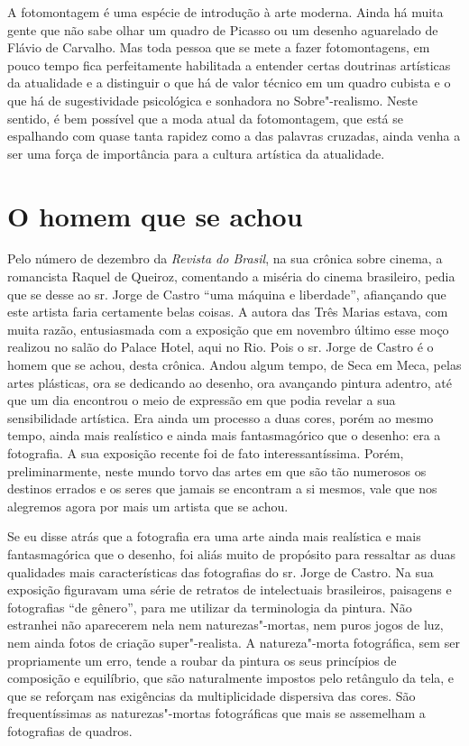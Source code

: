 A fotomontagem é uma espécie de introdução à arte moderna. Ainda há
muita gente que não sabe olhar um quadro de Picasso ou um desenho
aguarelado de Flávio de Carvalho. Mas toda pessoa que se mete a fazer
fotomontagens, em pouco tempo fica perfeitamente habilitada a entender
certas doutrinas artísticas da atualidade e a distinguir o que há de
valor técnico em um quadro cubista e o que há de sugestividade
psicológica e sonhadora no Sobre"-realismo. Neste sentido, é bem possível
que a moda atual da fotomontagem, que está se espalhando com quase tanta
rapidez como a das palavras cruzadas, ainda venha a ser uma força de
importância para a cultura artística da atualidade.

\chapter{O homem que se achou}

Pelo número de dezembro da \emph{Revista do Brasil}, na sua crônica
sobre cinema, a romancista Raquel de Queiroz, comentando a miséria do
cinema brasileiro, pedia que se desse ao sr. Jorge de Castro ``uma
máquina e liberdade'', afiançando que este artista faria certamente
belas coisas. A autora das Três Marias estava, com muita razão,
entusiasmada com a exposição que em novembro último esse moço realizou
no salão do Palace Hotel, aqui no Rio. Pois o sr. Jorge de Castro é o
homem que se achou, desta crônica. Andou algum tempo, de Seca em Meca,
pelas artes plásticas, ora se dedicando ao desenho, ora avançando
pintura adentro, até que um dia encontrou o meio de expressão em que
podia revelar a sua sensibilidade artística. Era ainda um processo a
duas cores, porém ao mesmo tempo, ainda mais realístico e ainda mais
fantasmagórico que o desenho: era a fotografia. A sua exposição recente
foi de fato interessantíssima. Porém, preliminarmente, neste mundo torvo
das artes em que são tão numerosos os destinos errados e os seres que
jamais se encontram a si mesmos, vale que nos alegremos agora por mais
um artista que se achou.

Se eu disse atrás que a fotografia era uma arte ainda mais realística e
mais fantasmagórica que o desenho, foi aliás muito de propósito para
ressaltar as duas qualidades mais características das fotografias do sr.
Jorge de Castro. Na sua exposição figuravam uma série de retratos de
intelectuais brasileiros, paisagens e fotografias ``de gênero'', para me
utilizar da terminologia da pintura. Não estranhei não aparecerem nela
nem naturezas"-mortas, nem puros jogos de luz, nem ainda fotos de criação
super"-realista. A natureza"-morta fotográfica, sem ser propriamente um
erro, tende a roubar da pintura os seus princípios de composição e
equilíbrio, que são naturalmente impostos pelo retângulo da tela, e que
se reforçam nas exigências da multiplicidade dispersiva das cores. São
frequentíssimas as naturezas"-mortas fotográficas que mais se assemelham
a fotografias de quadros.

